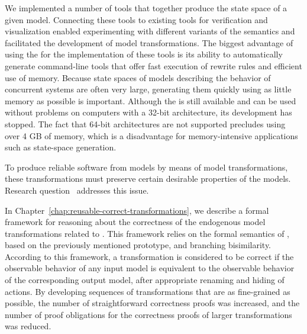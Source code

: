 \RQThree

\noindent
We implemented a number of tools that together produce the state space of a given \SLCO model.
Connecting these tools to existing tools for verification and visualization enabled experimenting with different variants of the semantics and facilitated the development of model transformations.
The biggest advantage of using the \ASFSDFME for the implementation of these tools is its ability to automatically generate command-line tools that offer fast execution of rewrite rules and efficient use of memory.
Because state spaces of models describing the behavior of concurrent systems are often very large, generating them quickly using as little memory as possible is important.
Although the \ASFSDFME is still available and can be used without problems on computers with a 32-bit architecture, its development has stopped.
The fact that 64-bit architectures are not supported precludes using over 4 GB of memory, which is a disadvantage for memory-intensive applications such as state-space generation.


To produce reliable software from models by means of model transformations, these transformations must preserve certain desirable properties of the models.
Research question~ addresses this issue.

\RQFour

\noindent
In Chapter~\ref{chap:reusable-correct-transformations}, we describe a formal framework for reasoning about the correctness of the endogenous model transformations related to \SLCO.
This framework relies on the formal semantics of \SLCO, based on the previously mentioned prototype, and branching bisimilarity.
According to this framework, a transformation is considered to be correct if the observable behavior of any input model is equivalent to the observable behavior of the corresponding output model, after appropriate renaming and hiding of actions.
By developing sequences of transformations that are as fine-grained as possible, the number of straightforward correctness proofs was increased, and the number of proof obligations for the correctness proofs of larger transformations was reduced.


